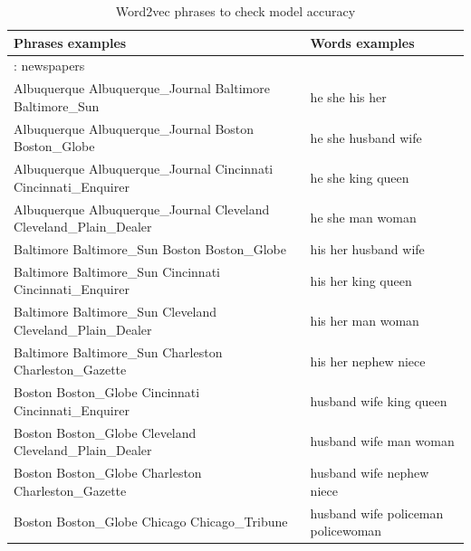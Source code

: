 \documentclass[letterpaper]{article}
\begin{document}
	\begin{table}[ht]
		\centering
		\begin{tabular}{|p{0.65\linewidth}|p{0.35\linewidth}|}
			\hline
			Phrases examples & Words examples\\
			\hline	  
			\hline
			: newspapers\\
			\hline
			Albuquerque Albuquerque\_Journal Baltimore Baltimore\_Sun & he she his her\\
			Albuquerque Albuquerque\_Journal Boston Boston\_Globe & he she husband wife\\
			Albuquerque Albuquerque\_Journal Cincinnati Cincinnati\_Enquirer & he she king queen\\
			Albuquerque Albuquerque\_Journal Cleveland Cleveland\_Plain\_Dealer & he she man woman\\
			\hline
			Baltimore Baltimore\_Sun Boston Boston\_Globe& his her husband wife\\
			Baltimore Baltimore\_Sun Cincinnati Cincinnati\_Enquirer & his her king queen\\
			Baltimore Baltimore\_Sun Cleveland Cleveland\_Plain\_Dealer & his her man woman\\
			Baltimore Baltimore\_Sun Charleston Charleston\_Gazette & his her nephew niece\\
			\hline
			Boston Boston\_Globe Cincinnati Cincinnati\_Enquirer & husband wife king queen	\\
			Boston Boston\_Globe Cleveland Cleveland\_Plain\_Dealer & husband wife man woman\\
			Boston Boston\_Globe Charleston Charleston\_Gazette & husband wife nephew niece\\
			Boston Boston\_Globe Chicago Chicago\_Tribune & husband wife policeman policewoman\\
			
			\hline
		\end{tabular}
		\caption{Word2vec phrases to check model accuracy}
		\label{tab:phrases-check-accuracy}
	\end{table}	
	
\end{document}
